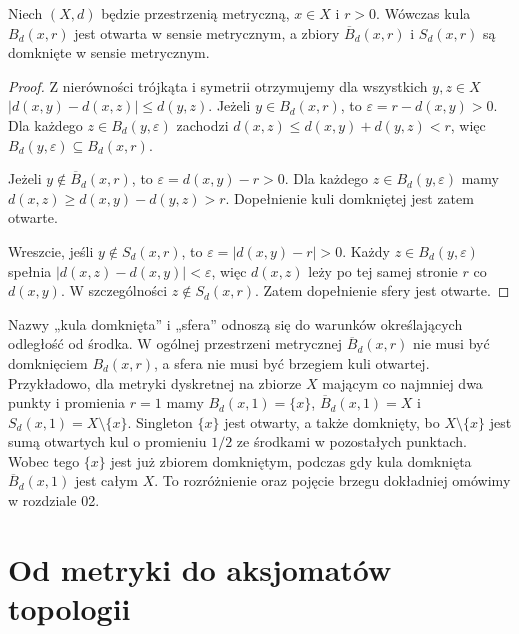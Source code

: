\begin{stwierdzenie}
\label{prop:topog-kule-otwarte-sfery-domkniete}
Niech $(X,d)$ będzie przestrzenią metryczną,
$x\in X$ i $r>0$. Wówczas kula $B_d(x,r)$ jest otwarta
w sensie metrycznym, a zbiory $\overline B_d(x,r)$
i $S_d(x,r)$ są domknięte w sensie metrycznym.
\end{stwierdzenie}
\begin{proof}
Z nierówności trójkąta i symetrii otrzymujemy dla
wszystkich $y,z\in X$
$|d(x,y)-d(x,z)|\le d(y,z)$.
Jeżeli $y\in B_d(x,r)$, to $\varepsilon=r-d(x,y)>0$.
Dla każdego $z\in B_d(y,\varepsilon)$ zachodzi
$d(x,z)\le d(x,y)+d(y,z)<r$, więc
$B_d(y,\varepsilon)\subseteq B_d(x,r)$.

Jeżeli $y\notin\overline B_d(x,r)$, to
$\varepsilon=d(x,y)-r>0$. Dla każdego
$z\in B_d(y,\varepsilon)$ mamy
$d(x,z)\ge d(x,y)-d(y,z)>r$.
Dopełnienie kuli domkniętej jest zatem otwarte.

Wreszcie, jeśli $y\notin S_d(x,r)$, to
$\varepsilon=|d(x,y)-r|>0$. Każdy
$z\in B_d(y,\varepsilon)$ spełnia
$|d(x,z)-d(x,y)|<\varepsilon$,
więc $d(x,z)$ leży po tej samej stronie $r$ co $d(x,y)$.
W szczególności $z\notin S_d(x,r)$.
Zatem dopełnienie sfery jest otwarte.
\end{proof}

\begin{uwaga}
\label{rem:topog-kula-domknieta-a-domkniecie}
Nazwy „kula domknięta” i „sfera” odnoszą się do
warunków określających odległość od środka. W ogólnej przestrzeni
metrycznej $\overline B_d(x,r)$ nie musi być domknięciem
$B_d(x,r)$, a sfera nie musi być brzegiem kuli otwartej.
Przykładowo, dla metryki dyskretnej na zbiorze $X$
mającym co najmniej dwa punkty i promienia $r=1$ mamy
$B_d(x,1)=\{x\}$, $\overline B_d(x,1)=X$ i
$S_d(x,1)=X\setminus\{x\}$.
Singleton $\{x\}$ jest otwarty, a także domknięty,
bo $X\setminus\{x\}$ jest sumą otwartych kul o promieniu
$1/2$ ze środkami w pozostałych punktach. Wobec tego
$\{x\}$ jest już zbiorem domkniętym, podczas gdy
kula domknięta $\overline B_d(x,1)$ jest całym $X$.
To rozróżnienie oraz pojęcie brzegu dokładniej omówimy
w rozdziale 02.
\end{uwaga}

\section{Od metryki do aksjomatów topologii}
\label{sec:topog-odleglosc-otwarte}

